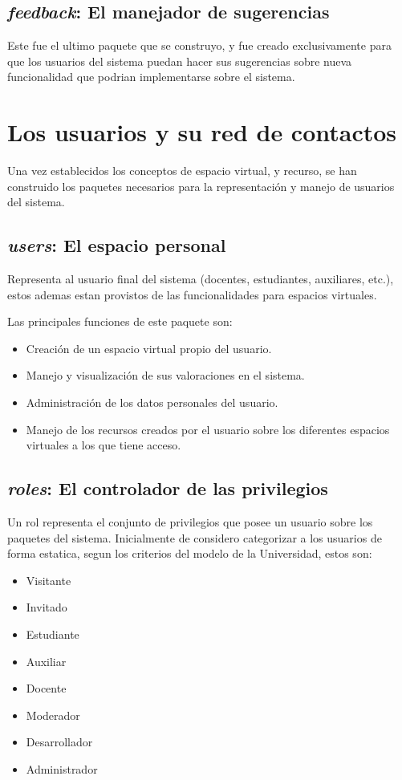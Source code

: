 \subsection{\emph{feedback}: El manejador de sugerencias}
Este fue el ultimo paquete que se construyo, y fue creado exclusivamente para
que los usuarios del sistema puedan hacer sus sugerencias sobre nueva
funcionalidad que podrian implementarse sobre el sistema.

\section{Los usuarios y su red de contactos}
Una vez establecidos los conceptos de espacio virtual, y recurso, se han
construido los paquetes necesarios para la representación y manejo de usuarios
del sistema.

\subsection{\emph{users}: El espacio personal}
Representa al usuario final del sistema (docentes, estudiantes, auxiliares,
etc.), estos ademas estan provistos de las funcionalidades para espacios
virtuales.

Las principales funciones de este paquete son:

\begin{itemize}
\item Creación de un espacio virtual propio del usuario.
\item Manejo y visualización de sus valoraciones en el sistema.
\item Administración de los datos personales del usuario.
\item Manejo de los recursos creados por el usuario sobre los diferentes
espacios virtuales a los que tiene acceso.
\end{itemize}

\subsection{\emph{roles}: El controlador de las privilegios}
Un rol representa el conjunto de privilegios que posee un usuario sobre los
paquetes del sistema.
Inicialmente de considero categorizar a los usuarios de forma estatica, segun
los criterios del modelo de la Universidad, estos son:

\begin{itemize}
\item Visitante
\item Invitado
\item Estudiante
\item Auxiliar
\item Docente
\item Moderador
\item Desarrollador
\item Administrador
\end{itemize}

